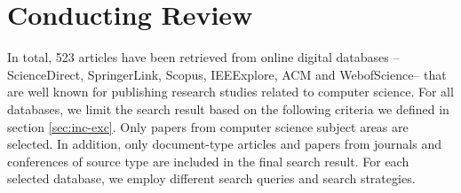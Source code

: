 


\section{Conducting Review}
In total, 523 articles have been retrieved from online digital databases -- ScienceDirect, SpringerLink, Scopus, IEEExplore, ACM and WebofScience-- that are well known for publishing research studies related to computer science. 
For all databases, we limit the search result based on the following criteria we defined in section \ref{sec:inc-exc}. Only papers from computer science subject areas are selected. In addition, only document-type articles and papers from journals and conferences of source type are included in the final search result. For each selected database, we employ different search queries and search strategies.








